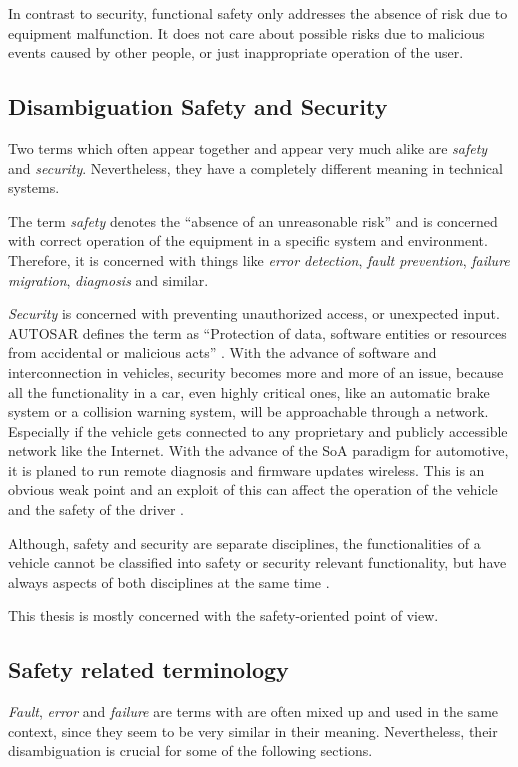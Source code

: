 In contrast to security, functional safety only addresses the absence of risk due to equipment malfunction. It does not care about possible risks due to malicious events caused by other people, or just inappropriate operation of the user.


\subsection{Disambiguation Safety and Security}
Two terms which often appear together and appear very much alike are \emph{safety} and \emph{security}. Nevertheless, they have a completely different meaning in technical systems.

The term \emph{safety} denotes the ``absence of an unreasonable risk'' \cite{autosar_glossary} \cite{iso26262:1} and is concerned with correct operation of the equipment in a specific system and environment. Therefore, it is concerned with things like \emph{error detection}, \emph{fault prevention}, \emph{failure migration}, \emph{diagnosis} and similar.

\emph{Security} is concerned with preventing unauthorized access, or unexpected input. \mbox{AUTOSAR} defines the term as ``Protection of data, software entities or resources from accidental or malicious acts'' \cite{autosar_glossary}. With the advance of software and interconnection in vehicles, security becomes more and more of an issue, because all the functionality in a car, even highly critical ones, like an automatic brake system or a collision warning system, will be approachable through a network. Especially if the vehicle gets connected to any proprietary and publicly accessible network like the Internet. With the advance of the SoA paradigm for automotive, it is planed to run remote diagnosis and firmware updates wireless. This is an obvious weak point and an exploit of this can affect the operation of the vehicle and the safety of the driver \cite{nilsson2008}.

Although, safety and security are separate disciplines, the functionalities of a vehicle cannot be classified into safety or security relevant functionality, but have always aspects of both disciplines at the same time \cite{nilsson2008}. 

This thesis is mostly concerned with the safety-oriented point of view.


\subsection{Safety related terminology}
\label{sec:fault,error,failure}
\emph{Fault}, \emph{error} and \emph{failure} are terms with are often mixed up and used in the same context, since they seem to be very similar in their meaning. Nevertheless, their disambiguation is crucial for some of the following sections.


